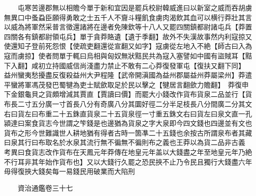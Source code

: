 　　屯寒苦邊郡無以相贍今單于新和宜因是罷兵校尉韓威進曰以新室之威而吞胡虜無異口中蚤蝨臣願得勇敢之士五千人不齎斗糧飢食虜肉渴飲其血可以横行莽壯其言以威為將軍然采普言徵還諸將在邊者免陳欽等十八人又罷四關鎮都尉諸屯兵【莽置四關各有鎮都尉領屯兵】單于貪莽賂遺【遺于季翻】故外不失漢故事然内利寇掠又使還知子登前死怨恨【使疏吏翻還從宣翻又如字】寇虜從左地入不絶【師古曰入為寇而虜掠】使者問單于輒曰烏相與匈奴無狀黠民共為寇入塞譬如中國有盜賊耳【黠下入翻】咸初立持國威信尚淺盡力禁止不敢有二心莽復發軍屯【復扶又翻下同】　益州蠻夷愁擾盡反復殺益州大尹程隆【武帝開滇國為益州郡屬益州莽屬梁州】莽遣平蠻將軍馮茂發巴蜀犍為吏士賦歛取足於民以擊之【犍居言翻歛力贍翻】　莽復申下金銀龜貝之貨頗增減其賈直【賈讀曰價】而罷大小錢改作貨布貨泉二品並行【貨布長二寸五分廣一寸首長八分有奇廣八分其圜好徑二分半足枝長八分間廣二分其文右曰貨左曰布重二十五銖直貨泉二十五貨泉徑一寸重五銖文右曰貨左曰泉文直一孔潁達曰案食貨志今世謂之笇錢是也邊猶為貨泉之字大泉即今四文錢也四邊並有文也貨布之形今世難識世人耕地猶有得者古時一箇凖二十五錢也余按古所謂泉布者其藏曰泉其行曰布取名於水泉其流行無不徧無不徧則布之義也王莽以為貨二品非古義　考異曰食貨志改作貨布在天鳳元年莽傳在地皇元年盖以大錢盡之年至地皇元年乃絶不行耳非其年始作貨布也】又以大錢行久罷之恐民挾不止乃令民且獨行大錢盡六年毋得復挾大錢矣每一易錢民用破業而大陷刑

　　資治通鑑卷三十七  
    


 


 



 

 
  







 


　　
　　
　
　
　


　　

　















	
	









































